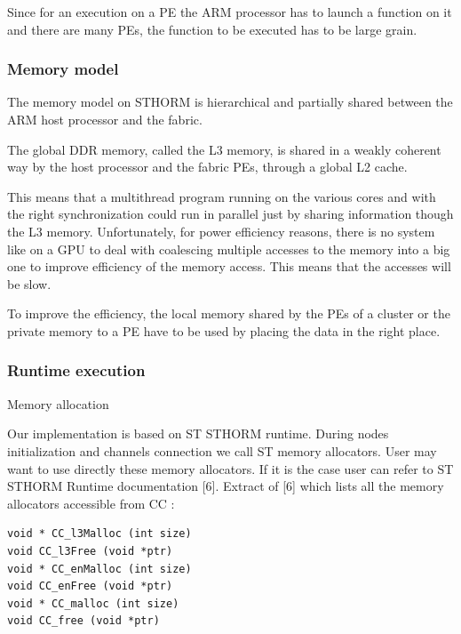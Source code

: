 \documentclass[a4paper]{article}
\begin{document}
Since for an execution on a PE the ARM processor has to launch a function
on it and there are many PEs, the function to be executed has to be large
grain.


\subsubsection{Memory model}
\label{sec:memory-model}

The memory model on STHORM is hierarchical and partially shared between
the ARM host processor and the fabric.

The global DDR memory, called the L3 memory, is shared in a weakly
coherent way by the host processor and the fabric PEs, through a global L2
cache.

This means that a multithread program running on the various cores and
with the right synchronization could run in parallel just by sharing
information though the L3 memory. Unfortunately, for power efficiency
reasons, there is no system like on a GPU to deal with coalescing multiple
accesses to the memory into a big one to improve
efficiency of
the memory access. This means that the accesses will be slow.

To improve the efficiency, the local memory shared by the PEs of a cluster
or the private memory to a PE
have to be used by placing the data in the right place.


\subsubsection{Runtime execution}
\label{sec:runtime-execution}


Memory allocation

Our implementation is based on ST STHORM runtime. During nodes initialization and
channels connection we call ST memory allocators. User may want to use directly these memory
allocators. If it is the case user can refer to ST STHORM Runtime documentation [6]. Extract
of [6] which lists all the memory allocators accessible from CC :
\begin{lstlisting}
void * CC_l3Malloc (int size)
void CC_l3Free (void *ptr)
void * CC_enMalloc (int size)
void CC_enFree (void *ptr)
void * CC_malloc (int size)
void CC_free (void *ptr)
\end{lstlisting}
\end{document}
